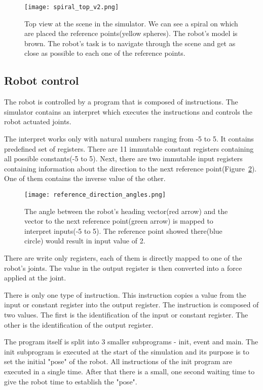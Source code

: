 \documentclass{ExcelAtFIT}
\begin{document}
\begin{figure}[t]
\centering
{\texttt{[image: spiral\_top\_v2.png]}}
\caption{Top view at the scene in the simulator.
We can see a spiral on which are placed the reference points(yellow spheres).
The robot's model is brown.
The robot's task is to navigate through the scene and get as close as possible to each one of the reference points.}
\label{fig:SpiralTop}
\end{figure}


\subsection{Robot control}
The robot is controlled by a program that is composed of instructions.
The simulator contains an interpret which executes the instructions and controls the robot actuated joints.

The interpret works only with natural numbers ranging from -5 to 5.
It contains predefined set of registers.
There are 11 immutable constant registers containing all possible constants(-5 to 5).
Next, there are two immutable input registers containing information about the direction to the next reference point(Figure~\ref{fig:ReferenceDirection}).
One of them contains the inverse value of the other.

\begin{figure}[t]
	\centering
	{\texttt{[image: reference\_direction\_angles.png]}}
	\caption{
		The angle between the robot's heading vector(red arrow) and the vector to the next reference point(green arrow) is mapped to interpret inputs(-5 to 5).
		The reference point showed there(blue circle) would result in input value of 2.
	}
	\label{fig:ReferenceDirection}
\end{figure}

There are write only registers, each of them is directly mapped to one of the robot's joints.
The value in the output register is then converted into a force applied at the joint.

There is only one type of instruction.
This instruction copies a value from the input or constant register into the output register.
The instruction is composed of two values.
The first is the identification of the input or constant register.
The other is the identification of the output register.

The program itself is split into 3 smaller subprograms - init, event and main.
The init subprogram is executed at the start of the simulation and its purpose is to set the initial "pose" of the robot.
All instructions of the init program are executed in a single time.
After that there is a small, one second waiting time to give the robot time to establish the "pose".
\end{document}
